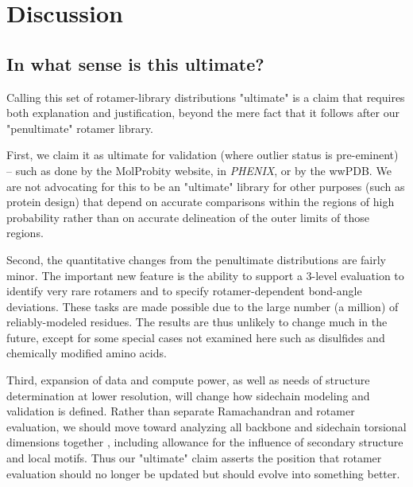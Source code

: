 \section{Discussion}

\subsection{In what sense is this ultimate?}
Calling this set of rotamer-library distributions "ultimate" is a claim that requires both explanation and justification, beyond the mere fact that it follows after our "penultimate" rotamer library. 

First, we claim it as ultimate for validation (where outlier status is pre-eminent)  -- such as done by the MolProbity website, in \textit{PHENIX}, or by the wwPDB. We are not advocating for this to be an "ultimate" library for other purposes (such as protein design) that depend on accurate comparisons within the regions of high probability rather than on accurate delineation of the outer limits of those regions.

Second, the quantitative changes from the penultimate distributions are fairly minor. The important new feature is the ability to support a 3-level evaluation to identify very rare rotamers and to specify rotamer-dependent bond-angle deviations. These tasks are made possible due to the large number (a million) of reliably-modeled residues. The results are thus unlikely to change much in the future, except for some special cases not examined here such as disulfides and chemically modified amino acids.

Third, expansion of data and compute power, as well as needs of structure determination at lower resolution, will change how sidechain modeling and validation is defined. Rather than separate Ramachandran and rotamer evaluation, we should move toward analyzing all backbone and sidechain torsional dimensions together \cite{JSR_theplot_2013}, including allowance for the influence of secondary structure and local motifs. Thus our "ultimate" claim asserts the position that rotamer evaluation should no longer be updated but should evolve into something better.

